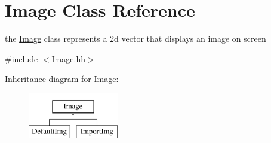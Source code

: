 \hypertarget{classImage}{\section{Image Class Reference}
\label{classImage}
}


the \hyperlink{classImage}{Image} class represents a 2d vector that displays an image on screen  




{\ttfamily \#include $<$Image.\-hh$>$}

Inheritance diagram for Image\-:\begin{figure}[H]
\begin{center}
\leavevmode
\includegraphics[height=2.000000cm]{classImage}
\end{center}
\end{figure}
